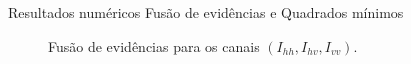 \documentclass[10pt]{beamer}
\begin{document}
\begin{frame}{Resultados numéricos}
\alert{Fusão de evidências e Quadrados mínimos}
\begin{figure}[hbt]
	\caption{Fusão de evidências para os canais $\left(I_{hh}, I_{hv}, I_{vv}\right)$.}
\endminipage\hfill
{}

\end{figure}
\end{frame}
\end{document}
